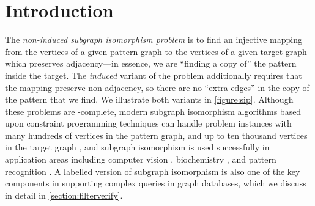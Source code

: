 \documentclass[twoside,11pt]{article}
\newcommand{\citep}[1]{\cite{#1}}
\begin{document}
\section{Introduction}\label{section:introduction}

The \emph{non-induced subgraph isomorphism problem} is to find an injective mapping from the
vertices of a given pattern graph to the vertices of a given target graph which preserves
adjacency---in essence, we are ``finding a copy of'' the pattern inside the target. The
\emph{induced} variant of the problem additionally requires that the mapping preserve non-adjacency,
so there are no ``extra edges'' in the copy of the pattern that we find. We illustrate both variants
in \cref{figure:sip}.  Although these problems are \NP-complete, modern subgraph
isomorphism algorithms based upon constraint programming techniques can handle problem instances
with many hundreds of vertices in the pattern graph, and up to ten thousand vertices in the target
graph
\citep{DBLP:journals/ai/Solnon10,DBLP:conf/cp/AudemardLMGP14,DBLP:conf/cp/McCreeshP15,DBLP:conf/lion/KotthoffMS16},
and subgraph isomorphism is used successfully in application areas including computer vision
\citep{DBLP:journals/cviu/DamiandSHJS11,DBLP:journals/pr/SolnonDHJ15}, biochemistry
\citep{o:10.1371/journal.pone.0076911,DBLP:conf/gbrpr/CarlettiFV15}, and pattern recognition
\citep{DBLP:journals/ijprai/ConteFSV04}.  A labelled version of subgraph isomorphism
is also one of the key components in supporting complex queries in graph databases, which we discuss in
detail in \cref{section:filterverify}.
\end{document}
